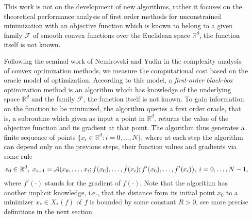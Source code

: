 \documentclass[12pt]{article}
\numberwithin{equation}{section}
\theoremstyle{definition}
\theoremstyle{remark}
\def\real{\mathbb{R}}
\begin{document}


This work is not on the development of new algorithms, rather it focuses on the theoretical
performance analysis of first order methods for unconstrained minimization with an objective
function which is known to belong to a given family $\mathcal{F}$ of smooth convex functions
over the Euclidean space $\real^d$, the function itself is not known.

Following the seminal work  of Nemirovski and Yudin \cite{nemi-yudi-book83} in the complexity
analysis of convex optimization methods, we measure the computational cost based on the oracle
model of optimization. According to this model, a \emph{first-order black-box} optimization
method is an algorithm which has knowledge of the underlying space $\real^d$ and the family
$\mathcal{F}$, the function itself is not known. To gain information on the function to be
minimized, the algorithm  queries a first order oracle, that is, a subroutine which given as
input a point in $\real^d$, returns the value of the objective function and its gradient at
that point. The algorithm thus generates a finite sequence of points $\{x_i\in \mathbb{R}^d :
i=0,\dots,N\}$, where at each step the algorithm can depend only on the previous steps, their
function values and gradients via some rule
$$
 x_0 \in \real^d,\; x_{i+1}={\cal A}(x_0,\dots,x_i; f(x_0),\dots,f(x_i); f'(x_0),\dots, f'(x_i)), \; i=0, \ldots, N-1,
$$
where $f'(\cdot)$ stands for the gradient of $f(\cdot)$.  Note that the algorithm has another
implicit knowledge, i.e., that the distance from its initial point $x_0$ to a minimizer
$x_\ast \in X_\ast(f)$ of $f$ is bounded by some constant $R>0$, see more precise definitions
in the next section.
\end{document}
